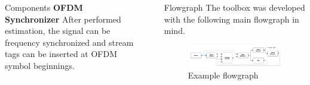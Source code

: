 \documentclass{beamer}
\begin{document}
\begin{frame}
\begin{columns}[t]
\begin{column}{0.33\textwidth}
\begin{block}{Components}
\textbf{OFDM Synchronizer}
After performed estimation, the signal can be frequency synchronized and stream tags can be inserted at OFDM symbol beginnings.
      \end{block}
    \end{column}
    \begin{column}{0.01\textwidth}
    \end{column}
    \begin{column}{0.66\textwidth}
      \begin{block}{Flowgraph}
        The toolbox was developed with the following main flowgraph in mind.
        \begin{figure}
          \includegraphics[width=\textwidth]{figures/flowgraph}
          \caption{Example flowgraph}
        \end{figure}


\end{block}
\end{column}
\end{columns}
\end{frame}
\end{document}
